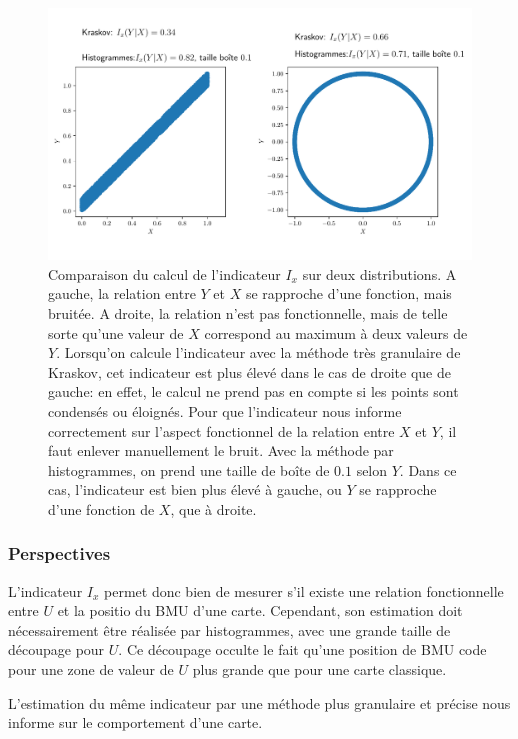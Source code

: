 \begin{figure}
    \centering
    \includegraphics[width=\textwidth]{comparaison_binning_kraskov.pdf}
    \caption{Comparaison du calcul de l'indicateur $I_x$ sur deux distributions. A gauche, la relation entre $Y$ et $X$ se rapproche d'une fonction, mais bruitée. A droite, la relation n'est pas fonctionnelle, mais de telle sorte qu'une valeur de $X$ correspond au maximum à deux valeurs de $Y$. Lorsqu'on calcule l'indicateur avec la méthode très granulaire de Kraskov, cet indicateur est plus élevé dans le cas de droite que de gauche: en effet, le calcul ne prend pas en compte si les points sont condensés ou éloignés. Pour que l'indicateur nous informe correctement sur l'aspect fonctionnel de la relation entre $X$ et $Y$, il faut enlever manuellement le bruit. Avec la méthode par histogrammes, on prend une taille de boîte de $0.1$ selon $Y$. Dans ce cas, l'indicateur est bien plus élevé à gauche, ou $Y$ se rapproche d'une fonction de $X$, que à droite.}
    \label{fig:exemple-limite}
    \end{figure}

\subsubsection{Perspectives}

L'indicateur $I_x$ permet donc bien de mesurer s'il existe une relation fonctionnelle entre $U$ et la positio du BMU d'une carte. Cependant, son estimation doit nécessairement être réalisée par histogrammes, avec une grande taille de découpage pour $U$. Ce découpage occulte le fait qu'une position de BMU code pour une zone de valeur de $U$ plus grande que pour une carte classique. 

L'estimation du même indicateur par une méthode plus granulaire et précise nous informe sur le comportement d'une carte.

